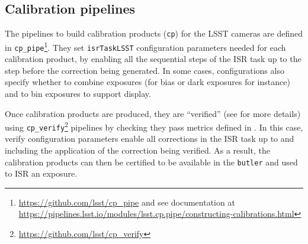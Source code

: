 \subsection{Calibration pipelines}
\label{sec:calib_pipe}

The pipelines to build calibration products (\texttt{cp}) for the LSST cameras are defined in \texttt{cp\_pipe}\footnote{\url{https://github.com/lsst/cp\_pipe} and see documentation at \url{https://pipelines.lsst.io/modules/lsst.cp.pipe/constructing-calibrations.html}}.
They set \texttt{isrTaskLSST} configuration parameters needed for each calibration product, by enabling all the sequential steps of the ISR task up to the step before the correction being generated. In some cases, configurations also specify whether to combine exposures (for bias or dark exposures for instance) and to bin exposures to support display.

Once calibration products are produced, they are ``verified'' (see \citet{DMTN-222} for more details) using \texttt{cp\_verify}\footnote{\url{https://github.com/lsst/cp\_verify}} pipelines by checking they pass metrics defined in \citep{DMTN-101}. In this case, verify configuration parameters enable all corrections in the ISR task up to and including the application of the correction being verified. As a result, the calibration products can then be certified to be available in the \texttt{butler} and used to ISR an exposure.
